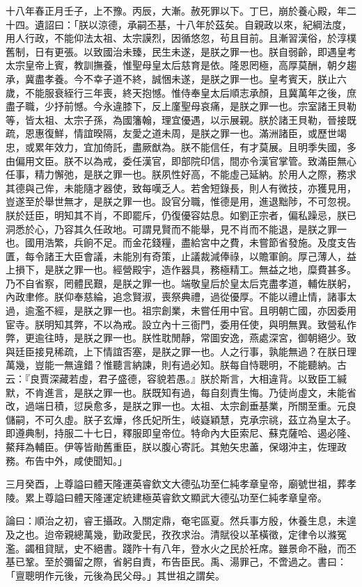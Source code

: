 \begin{pinyinscope}
十八年春正月壬子，上不豫。丙辰，大漸。赦死罪以下。丁巳，崩於養心殿，年二十四。遺詔曰：「朕以涼德，承嗣丕基，十八年於茲矣。自親政以來，紀綱法度，用人行政，不能仰法太祖、太宗謨烈，因循悠忽，茍且目前。且漸習漢俗，於淳樸舊制，日有更張。以致國治未臻，民生未遂，是朕之罪一也。朕自弱齡，即遇皇考太宗皇帝上賓，教訓撫養，惟聖母皇太后慈育是依。隆恩罔極，高厚莫酬，朝夕趨承，冀盡孝養。今不幸子道不終，誠悃未遂，是朕之罪一也。皇考賓天，朕止六歲，不能服衰絰行三年喪，終天抱憾。惟侍奉皇太后順志承顏，且冀萬年之後，庶盡子職，少抒前憾。今永違膝下，反上廑聖母哀痛，是朕之罪一也。宗室諸王貝勒等，皆太祖、太宗子孫，為國籓翰，理宜優遇，以示展親。朕於諸王貝勒，晉接既疏，恩惠復鮮，情誼暌隔，友愛之道未周，是朕之罪一也。滿洲諸臣，或歷世竭忠，或累年效力，宜加倚託，盡厥猷為。朕不能信任，有才莫展。且明季失國，多由偏用文臣。朕不以為戒，委任漢官，即部院印信，間亦令漢官掌管。致滿臣無心任事，精力懈弛，是朕之罪一也。朕夙性好高，不能虛己延納。於用人之際，務求其德與己侔，未能隨才器使，致每嘆乏人。若舍短錄長，則人有微技，亦獲見用，豈遂至於舉世無才，是朕之罪一也。設官分職，惟德是用，進退黜陟，不可忽視。朕於廷臣，明知其不肖，不即罷斥，仍復優容姑息。如劉正宗者，偏私躁忌，朕已洞悉於心，乃容其久任政地。可謂見賢而不能舉，見不肖而不能退，是朕之罪一也。國用浩繁，兵餉不足。而金花錢糧，盡給宮中之費，未嘗節省發施。及度支告匱，每令諸王大臣會議，未能別有奇策，止議裁減俸祿，以贍軍餉。厚己薄人，益上損下，是朕之罪一也。經營殿宇，造作器具，務極精工。無益之地，糜費甚多。乃不自省察，罔體民艱，是朕之罪一也。端敬皇后於皇太后克盡孝道，輔佐朕躬，內政聿修。朕仰奉慈綸，追念賢淑，喪祭典禮，過從優厚。不能以禮止情，諸事太過，逾濫不經，是朕之罪一也。祖宗創業，未嘗任用中官。且明朝亡國，亦因委用宦寺。朕明知其弊，不以為戒。設立內十三衙門，委用任使，與明無異。致營私作弊，更逾往時，是朕之罪一也。朕性耽閒靜，常圖安逸，燕處深宮，御朝絕少。致與廷臣接見稀疏，上下情誼否塞，是朕之罪一也。人之行事，孰能無過？在朕日理萬幾，豈能一無違錯？惟聽言納諫，則有過必知。朕每自恃聰明，不能聽納。古云：『良賈深藏若虛，君子盛德，容貌若愚。』朕於斯言，大相違背。以致臣工緘默，不肯進言，是朕之罪一也。朕既知有過，每自刻責生悔。乃徒尚虛文，未能省改，過端日積，愆戾愈多，是朕之罪一也。太祖、太宗創垂基業，所關至重。元良儲嗣，不可久虛。朕子玄燁，佟氏妃所生，岐嶷穎慧，克承宗祧，茲立為皇太子。即遵典制，持服二十七日，釋服即皇帝位。特命內大臣索尼、蘇克薩哈、遏必隆、鰲拜為輔臣。伊等皆勛舊重臣，朕以腹心寄託。其勉矢忠藎，保翊沖主，佐理政務。布告中外，咸使聞知。」

三月癸酉，上尊謚曰體天隆運英睿欽文大德弘功至仁純孝章皇帝，廟號世祖，葬孝陵。累上尊謚曰體天隆運定統建極英睿欽文顯武大德弘功至仁純孝章皇帝。

論曰：順治之初，睿王攝政。入關定鼎，奄宅區夏。然兵事方殷，休養生息，未遑及之也。迨帝親總萬幾，勤政愛民，孜孜求治。清賦役以革橫徵，定律令以滌冤濫。蠲租貸賦，史不絕書。踐阼十有八年，登水火之民於衽席。雖景命不融，而丕基已鞏。至於彌留之際，省躬自責，布告臣民。禹、湯罪己，不啻過之。書曰：「亶聰明作元後，元後為民父母。」其世祖之謂矣。


\end{pinyinscope}